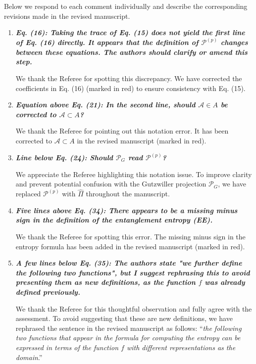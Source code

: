 \documentclass[12pt]{article}
\begin{document}
Below we respond to each comment individually and describe the corresponding revisions made in the revised manuscript.

\begin{enumerate}
    \item \textbf{\textit{Eq. (16): Taking the trace of Eq. (15) does not yield the first line of Eq. (16) directly. It appears that the definition of $\mathcal{P}^{(p)}$ changes between these equations. The authors should clarify or amend this step.}}

    We thank the Referee for spotting this discrepancy. We have corrected the coefficients in Eq. (16) (marked in red) to ensure consistency with Eq. (15).

    \item \textbf{\textit{Equation above Eq. (21): In the second line, should $\mathcal{A} \in A$ be corrected to $\mathcal{A} \subset A$?}}

    We thank the Referee for pointing out this notation error. It has been corrected to $\mathcal{A} \subset A$ in the revised manuscript (marked in red).

    \item \textbf{\textit{Line below Eq. (24): Should $\mathcal{P}_G$ read $\mathcal{P}^{(p)}$?}}

    We appreciate the Referee highlighting this notation issue. To improve clarity and prevent potential confusion with the Gutzwiller projection $\mathcal{P}_G$, we have replaced $\mathcal{P}^{(p)}$ with $\hat{\Pi}$ throughout the manuscript. 

    \item \textbf{\textit{Five lines above Eq. (34): There appears to be a missing minus sign in the definition of the entanglement entropy (EE).}}

    We thank the Referee for spotting this error. The missing minus sign in the entropy formula has been added in the revised manuscript (marked in red).

    \item \textbf{\textit{A few lines below Eq. (35): The authors state "we further define the following two functions", but I suggest rephrasing this to avoid presenting them as new definitions, as the function $f$ was already defined previously.}}

    We thank the Referee for this thoughtful observation and fully agree with the assessment. To avoid suggesting that these are new definitions, we have rephrased the sentence in the revised manuscript as follows: ``\textit{the following two functions that appear in the formula for computing the entropy can be expressed in terms of the function $f$ with different representations as the domain}.''


\end{enumerate}
\end{document}
